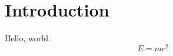 \documentclass{article}
\begin{document}
\section{Introduction}
Hello, world.
\begin{equation}
E = mc^2
\end{equation}
\end{document}
